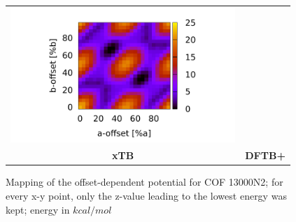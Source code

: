 \begin{figure}[H]
{\begin{tabular}{cc}
\includegraphics[trim={2cm 0cm 1.9cm 0.4cm},clip,width=8.5cm]{images/DFTB_all_13000N2_map.pdf} \\ 
\textbf{\Large{xTB}}\par\medskip & \textbf{\Large{DFTB+}}\par\medskip\\
\end{tabular}}
\caption{Mapping of the offset-dependent potential for COF 13000N2; for every x-y point, only the z-value leading to the lowest energy was kept; energy in $kcal/mol$}
\label{fig:13maps}
\end{figure}





